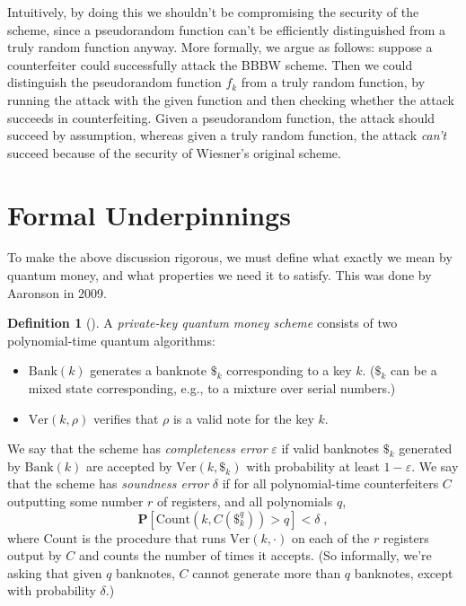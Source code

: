 \documentclass[11pt]{report}
\theoremstyle{plain}
\theoremstyle{definition}
\newtheorem{definition}[theorem]{Definition}
\newcommand{\eps}{\varepsilon}
\renewcommand{\Pr}{\mathbf{P}}
\begin{document}
Intuitively, by doing this we shouldn't be compromising the security of the scheme, since a pseudorandom function can't be efficiently distinguished from a truly random function anyway.  More formally, we argue as follows: suppose a counterfeiter could successfully attack the BBBW scheme.  Then we could distinguish the pseudorandom function $f_k$ from a truly random function, by running the attack with the given function and then checking whether the attack succeeds in counterfeiting.  Given a pseudorandom function, the attack should succeed by assumption, whereas given a truly random function, the attack {\em can't} succeed because of the security of Wiesner's original scheme.

\section{Formal Underpinnings}

To make the above discussion rigorous, we must define what exactly we mean by quantum money, and what properties we need it to satisfy.  This was done by Aaronson \cite{Aar09} in 2009.

\begin{definition}[\cite{Aar09}] \label{def:private-key-quantum-money}
A \emph{private-key quantum money scheme} consists of two polynomial-time quantum algorithms:
\begin{itemize}
\item $\mathrm{Bank}(k)$ generates a banknote $\$_k$ corresponding to a key $k$. ($\$_k$ can be a mixed state corresponding, e.g., to a mixture over serial numbers.)
\item $\mathrm{Ver}(k,\rho)$ verifies that $\rho$ is a valid note for the key $k$.
\end{itemize}
We say that the scheme has \emph{completeness error} $\eps$ if valid banknotes $\$_k$ generated by $\mathrm{Bank}(k)$ are accepted by $\mathrm{Ver}(k,\$_k)$ with probability at least $1-\eps$.
We say that the scheme has {\em soundness error} $\delta$ if for all polynomial-time counterfeiters $C$ outputting some number $r$ of registers, and all polynomials $q$,
\[
\Pr[\mathrm{Count}(k,C(\$_k^q)) > q] < \delta \;,
\]
where $\mathrm{Count}$ is the procedure that runs $\mathrm{Ver}(k,\cdot)$ on each of the $r$ registers output by $C$ and counts the number of times it accepts. (So informally, we're asking that given $q$ banknotes, $C$ cannot generate more than $q$ banknotes, except with probability $\delta$.)
\end{definition}
\end{document}
